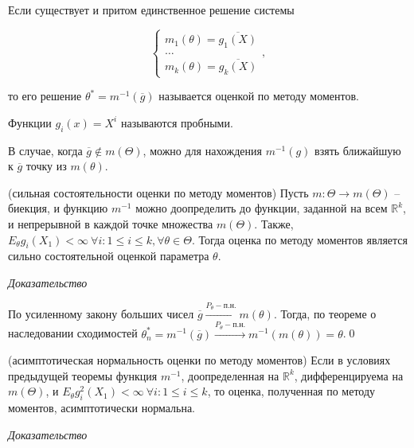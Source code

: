\begin{definition}
Если существует и притом единственное решение системы


\begin{equation*}
\begin{cases}
m_{1}( \theta ) =\overline{g_{1}( X)}\\
\dotsc \\
m_{k}( \theta ) =\overline{g_{k}( X)}
\end{cases} ,
\end{equation*}


то его решение $\displaystyle \theta ^{*} =m^{-1}(\overline{g})$ называется оценкой по методу моментов.
\end{definition}
\begin{definition}
Функции $\displaystyle g_{i}( x) =X^{i}$ называются пробными.
\end{definition}
\begin{note}
В случае, когда $\displaystyle \overline{g} \notin m( \Theta )$, можно для нахождения $\displaystyle m^{-1}( g)$ взять ближайшую к $\displaystyle \overline{g}$ точку из $\displaystyle m( \theta )$.
\end{note}
\begin{theorem}
(сильная состоятельности оценки по методу моментов) Пусть $\displaystyle m:\Theta \rightarrow m( \Theta )$ -- биекция, и функцию $\displaystyle m^{-1}$ можно доопределить до функции, заданной на всем $\displaystyle \mathbb{R}^{k}$, и непрерывной в каждой точке множества $\displaystyle m( \Theta )$. Также, $\displaystyle E_{\theta } g_{i}( X_{1}) < \infty \ \forall i:1\leqslant i\leqslant k,\forall \theta \in \Theta $. Тогда оценка по методу моментов является сильно состоятельной оценкой параметра $\displaystyle \theta $.
\end{theorem}
\textit{Доказательство}

По усиленному закону больших чисел $\displaystyle \overline{g}\xrightarrow{P_{\theta } -п.н.} m( \theta )$. Тогда, по теореме о наследовании сходимостей $\displaystyle \theta _{n}^{*} =m^{-1}(\overline{g})\xrightarrow{P_{\theta } -п.н.} m^{-1}( m( \theta )) =\theta $.\qed 
\begin{theorem}
(асимптотическая нормальность оценки по методу моментов) Если в условиях предыдущей теоремы функция $\displaystyle m^{-1}$, доопределенная на $\displaystyle \mathbb{R}^{k}$, дифференцируема на $\displaystyle m( \Theta )$, и $\displaystyle E_{\theta } g_{i}^{2}( X_{1}) < \infty \ \forall i:1\leqslant i\leqslant k$, то оценка, полученная по методу моментов, асимптотически нормальна.
\end{theorem}
\textit{Доказательство}

